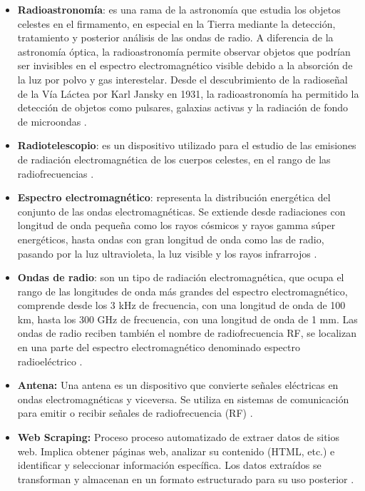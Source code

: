 \begin{itemize}
  \item \textbf{Radioastronomía}: es una rama de la astronomía que estudia los
    objetos celestes en el firmamento, en especial en la Tierra mediante la
    detección, tratamiento y posterior análisis de las ondas de radio.
    A diferencia de la astronomía óptica, la radioastronomía permite observar
    objetos que podrían ser invisibles en el espectro electromagnético visible
    debido a la absorción de la luz por polvo y gas interestelar. Desde el
    descubrimiento de la radioseñal de la Vía Láctea por Karl Jansky en 1931,
    la radioastronomía ha permitido la detección de objetos como pulsares,
    galaxias activas y la radiación de fondo de microondas \cite{Wilson2013}.

  \item \textbf{Radiotelescopio}: es un dispositivo utilizado para el estudio
    de las emisiones de radiación electromagnética de los cuerpos celestes,
    en el rango de las radiofrecuencias \cite{OrdonezToro2018}.

  \item \textbf{Espectro electromagnético}: representa la distribución
    energética del conjunto de las ondas electromagnéticas.
    Se extiende desde radiaciones con longitud de onda pequeña como los rayos
    cósmicos y rayos gamma súper energéticos, hasta ondas con gran longitud
    de onda como las de radio, pasando por la luz ultravioleta, la luz visible
    y los rayos infrarrojos \cite{OrdonezToro2018}.

  \item \textbf{Ondas de radio}: son un tipo de radiación electromagnética,
    que ocupa el rango de las longitudes de onda más grandes del espectro
    electromagnético, comprende desde los 3 kHz de frecuencia, con una longitud
    de onda de 100 km, hasta los 300 GHz de frecuencia, con una longitud de onda
    de 1 mm. Las ondas de radio reciben también el nombre de radiofrecuencia RF,
    se localizan en una parte del espectro electromagnético denominado espectro
    radioeléctrico \cite{Universo2017}.

  \item \textbf{Antena:} Una antena es un dispositivo que convierte señales
    eléctricas en ondas electromagnéticas y viceversa.
    Se utiliza en sistemas de comunicación para emitir o recibir señales de
    radiofrecuencia (RF) \cite{Kraus1950}.

  \item \textbf{Web Scraping:} Proceso proceso automatizado de extraer datos de
    sitios web.
    Implica obtener páginas web, analizar su contenido (HTML, etc.) e identificar
    y seleccionar información específica.
    Los datos extraídos se transforman y almacenan en un formato estructurado
    para su uso posterior \cite{Thapelo2021}.


\end{itemize}
